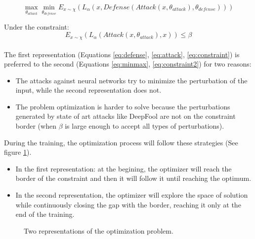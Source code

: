 \documentclass[12pt]{article}
\begin{document}
\begin{equation}\label{eq:minmax}
\max_{\theta_{attack}} \min_{\theta_{defense}} E_{x \sim \chi}(L_{\alpha}(x, Defense(Attack(x, \theta_{attack}), \theta_{defense})))
\end{equation}

Under the constraint:
\begin{equation}\label{eq:constraint2}
E_{x \sim \chi}(L_{\alpha}(Attack(x, \theta_{attack}), x)) \leq \beta
\end{equation}

\paragraph{}
The first representation (Equations \ref{eq:defense}, \ref{eq:attack}, \ref{eq:constraint}) is preferred to the second (Equations \ref{eq:minmax}, \ref{eq:constraint2}) for two reasons:
\begin{itemize}
\item The attacks against neural networks try to minimize the perturbation of the input, while the second representation does not.
\item The problem optimization is harder to solve because the perturbations generated by state of art attacks like DeepFool \cite{moosavi-dezfooli_deepfool:_2015} are not on the constraint border (when $\beta$ is large enough to accept all types of perturbations).
\end{itemize}

During the training, the optimization process will follow these strategies (See figure \ref{repr}).
\begin{itemize}
\item In the first representation: at the begining, the optimizer will reach the border of the constraint and then it will follow it until reaching the optimum.
\item In the second representation, the optimizer will explore the space of solution while continuously closing the gap with the border, reaching it only at the end of the training.
\end{itemize}

\begin{figure}[H]
\centering
{}
\caption{Two representations of the optimization problem.}
\label{repr}
\end{figure}
\end{document}
